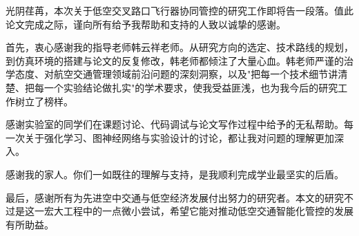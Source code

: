 \documentclass[12pt,a4paper,UTF8]{ctexbook}
\begin{document}
光阴荏苒，本次关于低空交叉路口飞行器协同管控的研究工作即将告一段落。值此论文完成之际，谨向所有给予我帮助和支持的人致以诚挚的感谢。

首先，衷心感谢我的指导老师韩云祥老师。从研究方向的选定、技术路线的规划，到仿真环境的搭建与论文的反复修改，韩老师都倾注了大量心血。韩老师严谨的治学态度、对航空交通管理领域前沿问题的深刻洞察，以及"把每一个技术细节讲清楚、把每一个实验结论做扎实"的学术要求，使我受益匪浅，也为我今后的研究工作树立了榜样。

感谢实验室的同学们在课题讨论、代码调试与论文写作过程中给予的无私帮助。每一次关于强化学习、图神经网络与实验设计的讨论，都让我对问题的理解更加深入。

感谢我的家人。你们一如既往的理解与支持，是我顺利完成学业最坚实的后盾。

最后，感谢所有为先进空中交通与低空经济发展付出努力的研究者。本文的研究不过是这一宏大工程中的一点微小尝试，希望它能对推动低空交通智能化管控的发展有所助益。
\end{document}
